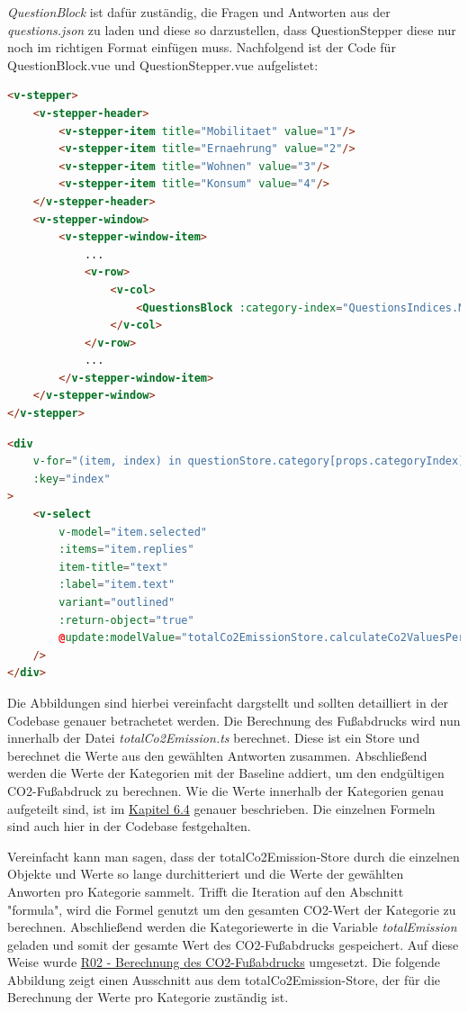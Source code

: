 \textit{QuestionBlock} ist dafür zuständig, die Fragen und Antworten aus der \textit{questions.json} zu laden und diese so darzustellen, dass QuestionStepper diese nur noch im richtigen Format einfügen muss. Nachfolgend ist der Code für QuestionBlock.vue und QuestionStepper.vue aufgelistet:

\begin{lstlisting}[language={html}, caption={QuestionStepper.vue}]
<v-stepper>
    <v-stepper-header>
        <v-stepper-item title="Mobilitaet" value="1"/>
        <v-stepper-item title="Ernaehrung" value="2"/>
        <v-stepper-item title="Wohnen" value="3"/>
        <v-stepper-item title="Konsum" value="4"/>
    </v-stepper-header>
    <v-stepper-window>
        <v-stepper-window-item>
            ...
            <v-row>
                <v-col>
                    <QuestionsBlock :category-index="QuestionsIndices.MOBILITY"/>
                </v-col>
            </v-row>
            ...
        </v-stepper-window-item>
    </v-stepper-window>
</v-stepper>
\end{lstlisting}

\newpage

\begin{lstlisting}[language={html}, caption={QuestionBlock.vue}]
<div
    v-for="(item, index) in questionStore.category[props.categoryIndex].questions"
    :key="index"
>
    <v-select
        v-model="item.selected"
        :items="item.replies"
        item-title="text"
        :label="item.text"
        variant="outlined"
        :return-object="true"
        @update:modelValue="totalCo2EmissionStore.calculateCo2ValuesPerCategory()"
    />
</div>
\end{lstlisting}

Die Abbildungen sind hierbei vereinfacht dargstellt und sollten detailliert in der Codebase genauer betrachetet werden. Die Berechnung des Fußabdrucks wird nun innerhalb der Datei \textit{totalCo2Emission.ts} berechnet. Diese ist ein Store und berechnet die Werte aus den gewählten Antworten zusammen. Abschließend werden die Werte der Kategorien mit der Baseline addiert, um den endgültigen CO2-Fußabdruck zu berechnen. Wie die Werte innerhalb der Kategorien genau aufgeteilt sind, ist im \hyperref[sec:anpassung-der-questions-json]{Kapitel 6.4} genauer beschrieben. Die einzelnen Formeln sind auch hier in der Codebase festgehalten.

Vereinfacht kann man sagen, dass der totalCo2Emission-Store durch die einzelnen Objekte und Werte so lange durchitteriert und die Werte der gewählten Anworten pro Kategorie sammelt. Trifft die Iteration auf den Abschnitt "formula", wird die Formel genutzt um den gesamten CO2-Wert der Kategorie zu berechnen. Abschließend werden die Kategoriewerte in die Variable \textit{totalEmission} geladen und somit der gesamte Wert des CO2-Fußabdrucks gespeichert. Auf diese Weise wurde \hyperref[sec:berechnung-des-co2abdrucks]{R02 - Berechnung des CO2-Fußabdrucks} umgesetzt. Die folgende Abbildung zeigt einen Ausschnitt aus dem totalCo2Emission-Store, der für die Berechnung der Werte pro Kategorie zuständig ist.

